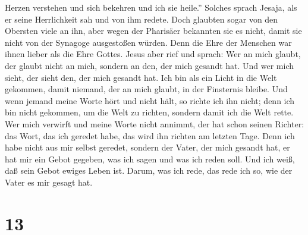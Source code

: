Herzen verstehen und sich bekehren und ich sie heile.'' 
Solches sprach Jesaja, als er seine Herrlichkeit sah und von ihm redete.
 Doch glaubten sogar von den Obersten viele an ihn, aber
wegen der Pharisäer bekannten sie es nicht, damit sie nicht von der
Synagoge ausgestoßen würden.  Denn die Ehre der Menschen
war ihnen lieber als die Ehre Gottes.  Jesus aber rief
und sprach: Wer an mich glaubt, der glaubt nicht an mich, sondern an
den, der mich gesandt hat.  Und wer mich sieht, der sieht
den, der mich gesandt hat.  Ich bin als ein Licht in die
Welt gekommen, damit niemand, der an mich glaubt, in der Finsternis
bleibe.  Und wenn jemand meine Worte hört und nicht hält,
so richte ich ihn nicht; denn ich bin nicht gekommen, um die Welt zu
richten, sondern damit ich die Welt rette.  Wer mich
verwirft und meine Worte nicht annimmt, der hat schon seinen Richter:
das Wort, das ich geredet habe, das wird ihn richten am letzten Tage.
 Denn ich habe nicht aus mir selbst geredet, sondern der
Vater, der mich gesandt hat, er hat mir ein Gebot gegeben, was ich sagen
und was ich reden soll.  Und ich weiß, daß sein Gebot
ewiges Leben ist. Darum, was ich rede, das rede ich so, wie der Vater es
mir gesagt hat.

\hypertarget{section-12}{%
\section{13}\label{section-12}}

